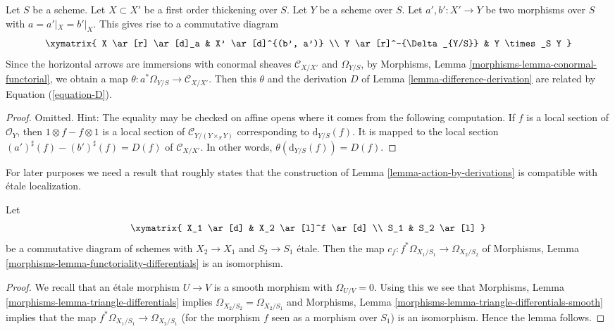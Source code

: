 \begin{lemma}
\label{lemma-omega-deformation}
Let $S$ be a scheme. Let $X \subset X'$ be a first order thickening over
$S$. Let $Y$ be a scheme over $S$. Let
$a', b' : X' \to Y$ be two morphisms over $S$ with
$a = a'|_X = b'|_X$. This gives rise to a commutative diagram
$$
\xymatrix{
X \ar[r] \ar[d]_a & X' \ar[d]^{(b', a')} \\
Y \ar[r]^-{\Delta_{Y/S}} & Y \times_S Y
}
$$
Since the horizontal arrows are immersions with conormal sheaves
$\mathcal{C}_{X/X'}$ and $\Omega_{Y/S}$, by
Morphisms, Lemma \ref{morphisms-lemma-conormal-functorial},
we obtain a map $\theta : a^*\Omega_{Y/S} \to \mathcal{C}_{X/X'}$.
Then this $\theta$ and the derivation $D$ of
Lemma \ref{lemma-difference-derivation}
are related by Equation (\ref{equation-D}).
\end{lemma}

\begin{proof}
Omitted. Hint: The equality may be checked on affine opens where it
comes from the following computation. If $f$ is a local section of
$\mathcal{O}_Y$, then $1 \otimes f - f \otimes 1$ is a local section
of $\mathcal{C}_{Y/(Y \times_S Y)}$ corresponding to $\text{d}_{Y/S}(f)$.
It is mapped to the local section $(a')^\sharp(f) - (b')^\sharp(f) = D(f)$
of $\mathcal{C}_{X/X'}$. In other words, $\theta(\text{d}_{Y/S}(f)) = D(f)$.
\end{proof}

\noindent
For later purposes we need a result that roughly states that the
construction of
Lemma \ref{lemma-action-by-derivations}
is compatible with \'etale localization.

\begin{lemma}
\label{lemma-sheaf-differentials-etale-localization}
Let
$$
\xymatrix{
X_1 \ar[d] & X_2 \ar[l]^f \ar[d] \\
S_1 & S_2 \ar[l]
}
$$
be a commutative diagram of schemes with $X_2 \to X_1$ and $S_2 \to S_1$
\'etale. Then the map $c_f : f^*\Omega_{X_1/S_1} \to \Omega_{X_2/S_2}$ of
Morphisms, Lemma \ref{morphisms-lemma-functoriality-differentials}
is an isomorphism.
\end{lemma}

\begin{proof}
We recall that an \'etale morphism $U \to V$ is a smooth morphism
with $\Omega_{U/V} = 0$. Using this we see that
Morphisms, Lemma \ref{morphisms-lemma-triangle-differentials}
implies $\Omega_{X_2/S_2} = \Omega_{X_2/S_1}$ and
Morphisms, Lemma \ref{morphisms-lemma-triangle-differentials-smooth}
implies that the map $f^*\Omega_{X_1/S_1} \to \Omega_{X_2/S_1}$
(for the morphism $f$ seen as a morphism over $S_1$)
is an isomorphism. Hence the lemma follows.
\end{proof}

